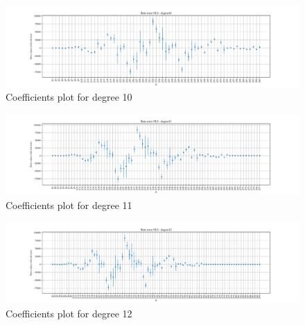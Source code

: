 \documentclass[11pt, a4paper]{article}
\begin{document}
\begin{figure}
  \centering
  \hspace*{-4.2cm}  
  \includegraphics[scale=0.52]{figures/EX6_EX1_OLS_beta_error_degree10.pdf}
  \caption{Coefficients plot for degree 10}
  \label{fig:EX6_1_OLS_betas_plot_degree10}
\end{figure}

\begin{figure}
  \centering
  \hspace*{-4.2cm}  
  \includegraphics[scale=0.52]{figures/EX6_EX1_OLS_beta_error_degree11.pdf}
  \caption{Coefficients plot for degree 11}
  \label{fig:EX6_1_OLS_betas_plot_degree11}
\end{figure}

\begin{figure}
  \centering
  \hspace*{-4.2cm}  
  \includegraphics[scale=0.52]{figures/EX6_EX1_OLS_beta_error_degree12.pdf}
  \caption{Coefficients plot for degree 12}
  \label{fig:EX6_1_OLS_betas_plot_degree12}
\end{figure}
\end{document}
